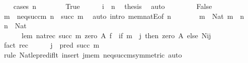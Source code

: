 \begin{isabellebody}
\ \ \isamarkupfalse%
\ {\isacharparenleft}{\kern0pt}cases\ {\isachardoublequoteopen}n\ {\isacharequal}{\kern0pt}\ {}{\isachardoublequoteclose}{\isacharparenright}{\kern0pt}\isanewline
\ \ \ \ \isamarkupfalse%
\ True\isanewline
\ \ \ \ \isamarkupfalse%
\ {\isacartoucheopen}i\ {\isacharless}{\kern0pt}\ n{\isacartoucheclose}\ \isamarkupfalse%
\ {\isacharquery}{\kern0pt}thesis\ \isamarkupfalse%
\ auto\isanewline
\ \ \isamarkupfalse%
\isanewline
\ \ \ \ \isamarkupfalse%
\ False\isanewline
\ \ \ \ \isamarkupfalse%
\ \isamarkupfalse%
\ m\ \ n{\isacharunderscore}{\kern0pt}eq{\isacharunderscore}{\kern0pt}succ{\isacharunderscore}{\kern0pt}m{\isacharcolon}{\kern0pt}\ {\isachardoublequoteopen}n\ {\isacharequal}{\kern0pt}\ succ\ m{\isachardoublequoteclose}\ \isamarkupfalse%
\ {\isacharparenleft}{\kern0pt}auto\ intro{\isacharcolon}{\kern0pt}\ mem{\isacharunderscore}{\kern0pt}natE{\isacharbrackleft}{\kern0pt}of\ n{\isacharbrackright}{\kern0pt}{\isacharparenright}{\kern0pt}\isanewline
\ \ \ \ \isamarkupfalse%
\ \isamarkupfalse%
\ {\isachardoublequoteopen}m\ {\isacharcolon}{\kern0pt}\ Nat{\isachardoublequoteclose}\ {\isachardoublequoteopen}m\ {\isacharless}{\kern0pt}\ n{\isachardoublequoteclose}\ \isamarkupfalse%
\ {\isacartoucheopen}n\ {\isacharcolon}{\kern0pt}\ Nat{\isacartoucheclose}\ \isamarkupfalse%
\isanewline
\ \ \ \ \isamarkupfalse%
\ \isamarkupfalse%
\isanewline
\ \ \ \ \ \ lem{\isacharcolon}{\kern0pt}\ {\isachardoublequoteopen}nat{\isacharunderscore}{\kern0pt}rec{\isacharprime}{\kern0pt}\ {\isacharparenleft}{\kern0pt}succ\ m{\isacharparenright}{\kern0pt}\ {\isacharparenleft}{\kern0pt}zero\ A{\isacharparenright}{\kern0pt}\ {\isacharquery}{\kern0pt}f\ {\isacharequal}{\kern0pt}\ {\isacharparenleft}{\kern0pt}if\ m\ {\isacharless}{\kern0pt}\ j\ then\ zero\ A\ else\ N{\isacharbackquote}{\kern0pt}i{\isacharbackquote}{\kern0pt}j{\isacharparenright}{\kern0pt}{\isachardoublequoteclose}\isanewline
\ \ \ \ \ \ \isamarkupfalse%
\ {\isacharparenleft}{\kern0pt}fact\ rec{\isacharparenright}{\kern0pt}\isanewline
\ \ \ \ \isamarkupfalse%
\ {\isachardoublequoteopen}j\ {\isasymle}\ pred\ {\isacharparenleft}{\kern0pt}succ\ m{\isacharparenright}{\kern0pt}{\isachardoublequoteclose}\isanewline
\ \ \ \ \ \ \isamarkupfalse%
\ {\isacharparenleft}{\kern0pt}rule\ Nat{\isacharunderscore}{\kern0pt}le{\isacharunderscore}{\kern0pt}pred{\isacharunderscore}{\kern0pt}if{\isacharunderscore}{\kern0pt}lt{\isacharparenright}{\kern0pt}\ {\isacharparenleft}{\kern0pt}insert\ j{\isacharunderscore}{\kern0pt}mem\ n{\isacharunderscore}{\kern0pt}eq{\isacharunderscore}{\kern0pt}succ{\isacharunderscore}{\kern0pt}m{\isacharbrackleft}{\kern0pt}symmetric{\isacharbrackright}{\kern0pt}{\isacharcomma}{\kern0pt}\ auto{\isacharparenright}{\kern0pt}\isanewline

\end{isabellebody}
